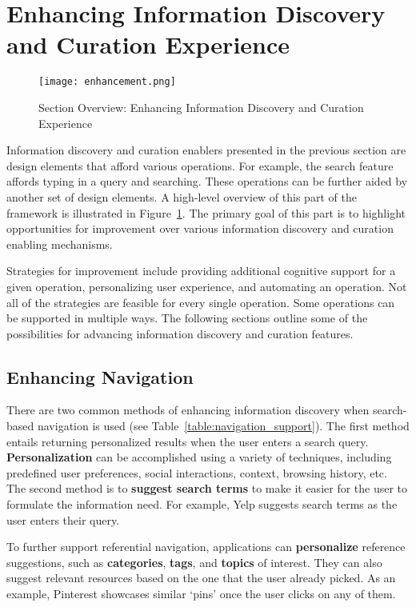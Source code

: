 {\section{Enhancing Information Discovery and Curation Experience}
\label{section:enhancing}

\begin{figure}[ht!]
	\noindent
	\centering
	\texttt{[image: enhancement.png]}
	\caption{Section Overview: Enhancing Information Discovery and Curation Experience}
	\label{fig:enhancement} 
\end{figure}
Information discovery and curation enablers presented in the previous section are design elements that afford various operations. For example, the search feature affords typing in a query and searching. These operations can be further aided by another set of design elements. A high-level overview of this part of the framework is illustrated in Figure~\ref{fig:enhancement}. The primary goal of this part is to highlight opportunities for improvement over various information discovery and curation enabling mechanisms.

Strategies for improvement include providing additional cognitive support for a given operation, personalizing user experience, and automating an operation. Not all of the strategies are feasible for every single operation. Some operations can be supported in multiple ways. The following sections outline some of the possibilities for advancing information discovery and curation features. 

{\subsection{Enhancing Navigation}
There are two common methods of enhancing information discovery when search-based navigation is used (see Table~\ref{table:navigation_support}). The first method entails returning personalized results when the user enters a search query. \textbf{Personalization} can be accomplished using a variety of techniques, including predefined user preferences, social interactions, context, browsing history, etc. The second method is to \textbf{suggest search terms} to make it easier for the user to formulate the information need. For example, Yelp suggests search terms as the user enters their query.

To further support referential navigation, applications can \textbf{personalize} reference suggestions, such as \textbf{categories}, \textbf{tags}, and \textbf{topics} of interest. They can also suggest relevant resources based on the one that the user already picked. As an example, Pinterest showcases similar `pins' once the user clicks on any of them.

}}
